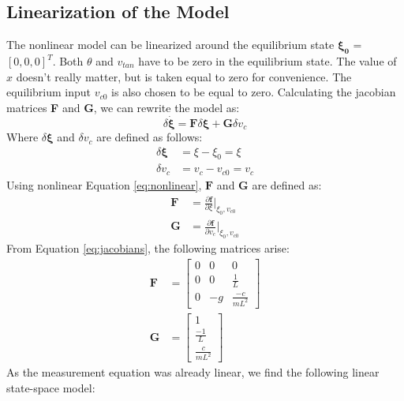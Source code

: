\documentclass[a4paper,kul]{kulakarticle} %
\begin{document}
\subsection{Linearization of the Model}
\label{sec:linearization}
The nonlinear model can be linearized around the equilibrium state $\mathbf{\xi_0}$ = $[0,0,0]^T$. Both $\theta$ and $v_{tan}$ have to be zero in the equilibrium state. The value of $x$ doesn't really matter, but is taken equal to zero for convenience. The equilibrium input $v_{c0}$ is also chosen to be equal to zero. Calculating the jacobian matrices \textbf{F} and \textbf{G}, we can rewrite the model as:
\begin{equation}
	\delta\mathbf{\dot{\xi}} = \mathbf{F}\delta\mathbf{\xi} + \mathbf{G}\delta v_c
	\label{eq:deltaxidotlinear}
	\end{equation}
	Where $\delta\mathbf{\xi}$ and $\delta v_c$ are defined as follows:
	\begin{equation}
	\begin{split}
	\delta\mathbf{\xi} &= \xi - \xi_0 = \xi \\
	\delta v_c &= v_c - v_{c0} = v_c
	\end{split}
	\end{equation}
	Using nonlinear Equation \ref{eq:nonlinear}, $\mathbf{F}$ and $\mathbf{G}$ are defined as: 
	\begin{equation}
	\begin{split}
	\mathbf{F} &= \frac{\partial \mathbf{f}}{\partial \xi}\Bigr|_{\xi_0, v_{c0}}\\
	\mathbf{G} &= \frac{\partial \mathbf{f}}{\partial v_{c}}\Bigr|_{\xi_0, v_{c0}}
	\end{split}	
	\label{eq:jacobians}
	\end{equation}
	From Equation \ref{eq:jacobians}, the following matrices arise:
	\begin{equation}
	\begin{split}
	\mathbf{F} &= \begin{bmatrix}
	0&0&0\\0&0&\frac{1}{L}\\0&-g&\frac{-c}{mL^2}
	\end{bmatrix}\\
	\mathbf{G} &= \begin{bmatrix}
	1\\\frac{-1}{L}\\\frac{c}{mL^2}
	\end{bmatrix}
	\end{split}
	\end{equation}
	As the measurement equation was already linear, we find the following linear state-space model:
	
\end{document}

